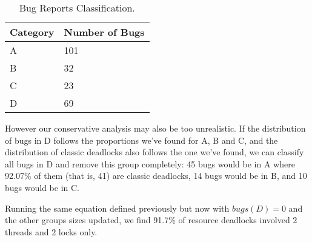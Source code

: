 \begin{table}
\begin{center}
\caption{Bug Reports Classification.}
\begin{tabular}{|l|l|}
\hline
Category & Number of Bugs \\
\hline
A & 101 \\   
B & 32 \\
C & 23 \\
D & 69 \\
\hline
\end{tabular}
\end{center}
\end{table}

However our conservative analysis may also be too unrealistic. If the distribution of bugs in D follows the proportions we've found for A, B and C, and the distribution of classic deadlocks also follows the one we've found, we can classify all bugs in D and remove this group completely: 45 bugs would be in A where 92.07\% of them (that is, 41) are classic deadlocks, 14 bugs would be in B, and 10 bugs would be in C.

Running the same equation defined previously but now with $bugs(D) = 0$ and the other groups sizes updated, we find 91.7\% of resource deadlocks involved 2 threads and 2 locks only.



